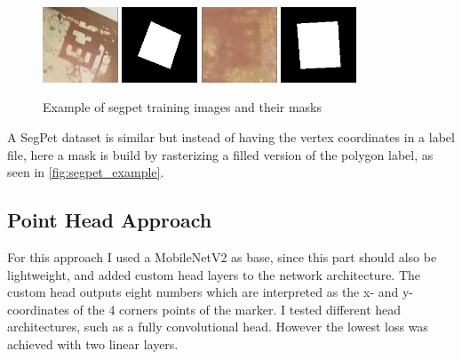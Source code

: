 \documentclass[10pt]{book}
\begin{document}
\begin{figure}
  \centering
     {\includegraphics[width=0.2\textwidth]{image/segpet_example_in}}
     {\includegraphics[width=0.2\textwidth]{image/segpet_example_seg}}
     {\includegraphics[width=0.2\textwidth]{image/segpet_example_2_in}}
     {\includegraphics[width=0.2\textwidth]{image/segpet_example_2_seg}}
  \caption{Example of segpet training images and their masks}
  \label{fig:segpet_example}
\end{figure}

A SegPet dataset is similar but instead of having the vertex coordinates in a label file, here a mask is build by rasterizing a filled version of the polygon label, as seen in \autoref{fig:segpet_example}.

\subsection{Point Head Approach}

For this approach I used a MobileNetV2 as base, since this part should also be lightweight, and added custom head layers to the network architecture. The custom head outputs eight numbers which are interpreted as the x- and y-coordinates of the 4 corners points of the marker. I tested different head architectures, such as a fully convolutional head. However the lowest loss was achieved with two linear layers.
\end{document}
